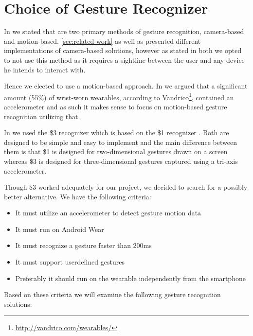 \section{Choice of Gesture Recognizer}
\label{sec:analysis:choice-of-wearables}

In \cite{prespecialisation} we stated that are two primary methods of gesture recognition, camera-based and motion-based.
\cref{sec:related-work} as well as \cite{prespecialisation} presented different implementations of camera-based solutions, however as stated in both we opted to not use this method as it requires a sightline between the user and any device he intends to interact with.

Hence we elected to use a motion-based approach.
In \cite{prespecialisation} we argued that a significant amount (55\%) of wrist-worn wearables, according to Vandrico\footnote{\url{http://vandrico.com/wearables/}}, contained an accelerometer and as such it makes sense to focus on motion-based gesture recognition utilizing that.

In \cite{prespecialisation} we used the \$3 recognizer \cite{threedollar} which is based on the \$1 recognizer \cite{wobbrock2007gestures}.
Both are designed to be simple and easy to implement and the main difference between them is that \$1 is designed for two-dimensional gestures drawn on a screen whereas \$3 is designed for three-dimensional gestures captured using a tri-axis accelerometer.

Though \$3 worked adequately for our project, we decided to search for a possibly better alternative.
We have the following criteria:

\begin{itemize}
    \item It must utilize an accelerometer to detect gesture motion data
    \item It must run on Android Wear
    \item It must recognize a gesture faster than 200ms
    \item It must support userdefined gestures
    \item Preferably it should run on the wearable independently from the smartphone
\end{itemize}
Based on these criteria we will examine the following gesture recognition solutions:

